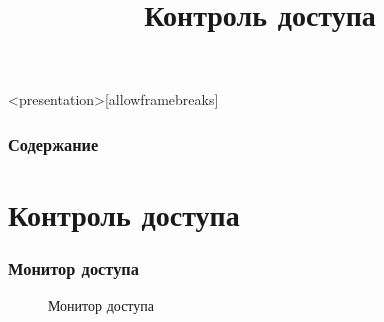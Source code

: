 
\title[Контроль доступа]{Контроль доступа}






\begin{frame}<presentation>[allowframebreaks]
    \frametitle{Содержание}\tableofcontents
\end{frame}


\section{Контроль доступа}


\begin{frame}
\frametitle{Монитор доступа}
\begin{figure}
    \begin{center}
        \caption{Монитор доступа}\label{pict:AccessControl}
    \end{center}
\end{figure} 
\end{frame}


